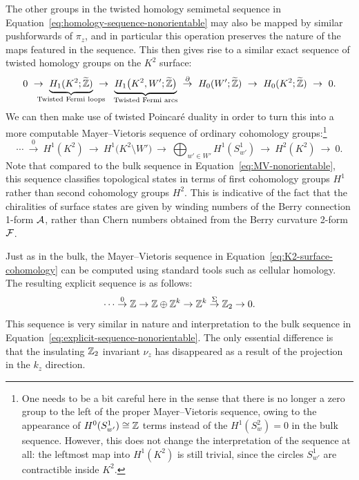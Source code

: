 The other groups in the twisted homology semimetal sequence in Equation~\eqref{eq:homology-sequence-nonorientable} may also be mapped by similar pushforwards of $\pi_z$, and in particular this operation preserves the nature of the maps featured in the sequence. This then gives rise to a similar exact sequence of twisted homology groups on the $K^2$ surface:
\begin{equation}
	0\ \to\ \underbrace{H_1(K^2;\ext{\Z})}_{\mathclap{\text{Twisted Fermi loops}}}\ \to\ \underbrace{H_1\big(K^2, W';\ext{\Z}\big)}_{\mathclap{\text{Twisted Fermi arcs}}}\ \overset{\partial}{\to}\ H_0(W';\ext{\Z})\ \to\ H_0(K^2;\ext{\Z})\ \to\ 0.
\end{equation}
We can then make use of twisted Poincaré duality in order to turn this into a more computable Mayer--Vietoris sequence of ordinary cohomology groups:\footnote{
	One needs to be a bit careful here in the sense that there is no longer a zero group to the left of the proper Mayer--Vietoris sequence, owing to the appearance of $H^0(S_{w'}^1)\cong\mathbb{Z}$ terms instead of the $H^1(S_w^2)=0$ in the bulk sequence. However, this does not change the interpretation of the sequence at all: the leftmost map into $H^1(K^2)$ is still trivial, since the circles $S_{w'}^1$ are contractible inside $K^2$.}
\begin{equation}\label{eq:K2-surface-cohomology}
	\cdots\ \overset{0}{\to}\ H^1(K^2)\ \to\ H^1\big(K^2\setminus W'\big)\ \to\ \bigoplus_{w'\in W'} H^1(S_{w'}^1)\ \to\ H^2(K^2)\ \to\ 0.
\end{equation}
Note that compared to the bulk sequence in Equation~\eqref{eq:MV-nonorientable}, this sequence classifies topological states in terms of first cohomology groups $H^1$ rather than second cohomology groups $H^2$. This is indicative of the fact that the chiralities of surface states are given by winding numbers of the Berry connection 1-form $\mathcal{A}$, rather than Chern numbers obtained from the Berry curvature 2-form $\mathcal{F}$.

Just as in the bulk, the Mayer--Vietoris sequence in Equation~\eqref{eq:K2-surface-cohomology} can be computed using standard tools such as cellular homology. %
The resulting explicit sequence is as follows:
\begin{equation}\label{eq:K2-MV-explicit}
	\cdots \overset{0}{\to} \mathbb{Z} \to \mathbb{Z}\oplus\mathbb{Z}^k \to \mathbb{Z}^k \overset{\Sigma}{\to} \mathbb{Z}_2 \to 0.
\end{equation}
This sequence is very similar in nature and interpretation to the bulk sequence in Equation~\eqref{eq:explicit-sequence-nonorientable}. The only essential difference is that the insulating $\mathbb{Z}_2$ invariant $\nu_z$ has disappeared as a result of the projection in the $k_z$ direction.

